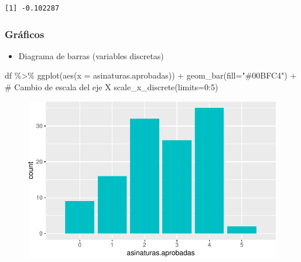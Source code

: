 \documentclass[
  a4paper,
]{scrreport}
\newenvironment{Shaded}{\begin{snugshade}}{\end{snugshade}}
\newcommand{\AttributeTok}[1]{\textcolor[rgb]{0.40,0.45,0.13}{#1}}
\newcommand{\CommentTok}[1]{\textcolor[rgb]{0.37,0.37,0.37}{#1}}
\newcommand{\ConstantTok}[1]{\textcolor[rgb]{0.56,0.35,0.01}{#1}}
\newcommand{\DecValTok}[1]{\textcolor[rgb]{0.68,0.00,0.00}{#1}}
\newcommand{\FunctionTok}[1]{\textcolor[rgb]{0.28,0.35,0.67}{#1}}
\newcommand{\NormalTok}[1]{\textcolor[rgb]{0.00,0.23,0.31}{#1}}
\newcommand{\SpecialCharTok}[1]{\textcolor[rgb]{0.37,0.37,0.37}{#1}}
\newcommand{\StringTok}[1]{\textcolor[rgb]{0.13,0.47,0.30}{#1}}
\providecommand{\tightlist}{%
  \setlength{\itemsep}{0pt}\setlength{\parskip}{0pt}}\usepackage{longtable,booktabs,array}
\theoremstyle{definition}
\theoremstyle{definition}
\theoremstyle{remark}
\begin{document}
\begin{Shaded}
\end{Shaded}

\begin{verbatim}
[1] -0.102287
\end{verbatim}

\hypertarget{gruxe1ficos}{%
\subsubsection{Gráficos}\label{gruxe1ficos}}

\begin{itemize}
\tightlist
\item
  Diagrama de barras (variables discretas)
\end{itemize}

\begin{Shaded}
\begin{Highlighting}[]
\NormalTok{df }\SpecialCharTok{\%\textgreater{}\%} \FunctionTok{ggplot}\NormalTok{(}\FunctionTok{aes}\NormalTok{(}\AttributeTok{x =}\NormalTok{ asinaturas.aprobadas)) }\SpecialCharTok{+} 
  \FunctionTok{geom\_bar}\NormalTok{(}\AttributeTok{fill=}\StringTok{"\#00BFC4"}\NormalTok{) }\SpecialCharTok{+} 
  \CommentTok{\# Cambio de escala del eje X}
  \FunctionTok{scale\_x\_discrete}\NormalTok{(}\AttributeTok{limits=}\DecValTok{0}\SpecialCharTok{:}\DecValTok{5}\NormalTok{) }
\end{Highlighting}
\end{Shaded}

\begin{figure}[H]

{\centering \includegraphics{./08-analisis-estadisticos_files/figure-pdf/unnamed-chunk-10-1.pdf}

}

\end{figure}
\end{document}
